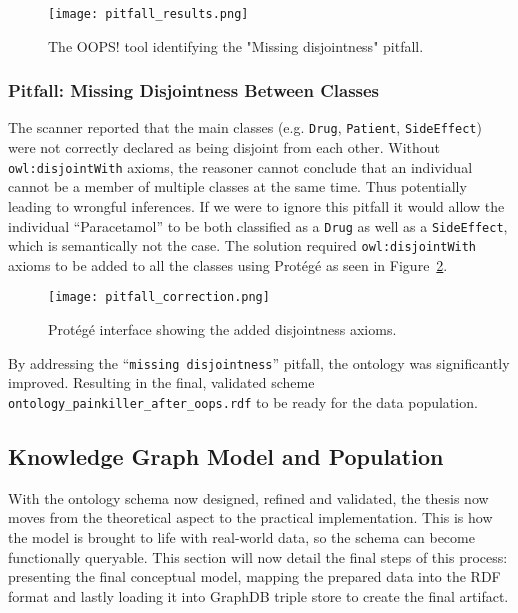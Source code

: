 \begin{figure}[H]
\centering
\texttt{[image: pitfall\_results.png]} %
\caption{The OOPS! tool identifying the "Missing disjointness" pitfall.}
\label{fig:oops_pitfall}
\end{figure}

\subsubsection*{Pitfall: Missing Disjointness Between Classes}
The scanner reported that the main classes (e.g. \texttt{Drug}, \texttt{Patient}, \texttt{SideEffect}) were not correctly declared as being disjoint from each other. Without \texttt{owl:disjointWith} axioms, the reasoner cannot conclude that an individual cannot be a member of multiple classes at the same time. Thus potentially leading to wrongful inferences. If we were to ignore this pitfall it would allow the individual “Paracetamol” to be both classified as a \texttt{Drug} as well as a \texttt{SideEffect}, which is semantically not the case. The solution required \texttt{owl:disjointWith} axioms to be added to all the classes using Protégé as seen in Figure~\ref{fig:oops_correction}.

\begin{figure}[H]
\centering
\texttt{[image: pitfall\_correction.png]} %
\caption{Protégé interface showing the added disjointness axioms.}
\label{fig:oops_correction}
\end{figure}

By addressing the “\texttt{missing disjointness}” pitfall, the ontology was significantly improved. Resulting in the final, validated scheme \nolinkurl{ontology_painkiller_after_oops.rdf} to be ready for the data population.

\subsection{Knowledge Graph Model and Population}
With the ontology schema now designed, refined and validated, the thesis now moves from the theoretical aspect to the practical implementation. This is how the model is brought to life with real-world data, so the schema can become functionally queryable. This section will now detail the final steps of this process: presenting the final conceptual model, mapping the prepared data into the RDF format and lastly loading it into GraphDB triple store to create the final artifact. 
